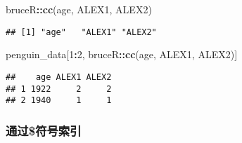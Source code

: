 \documentclass[
]{article}
\newenvironment{Shaded}{\begin{snugshade}}{\end{snugshade}}
\newcommand{\DecValTok}[1]{\textcolor[rgb]{0.00,0.00,0.81}{#1}}
\newcommand{\FunctionTok}[1]{\textcolor[rgb]{0.13,0.29,0.53}{\textbf{#1}}}
\newcommand{\NormalTok}[1]{#1}
\newcommand{\SpecialCharTok}[1]{\textcolor[rgb]{0.81,0.36,0.00}{\textbf{#1}}}
\newcommand{\StringTok}[1]{\textcolor[rgb]{0.31,0.60,0.02}{#1}}
\begin{document}
\begin{Shaded}
\begin{Highlighting}[]
\NormalTok{bruceR}\SpecialCharTok{::}\FunctionTok{cc}\NormalTok{(}\StringTok{\textquotesingle{}age, ALEX1, ALEX2\textquotesingle{}}\NormalTok{)}
\end{Highlighting}
\end{Shaded}

\begin{verbatim}
## [1] "age"   "ALEX1" "ALEX2"
\end{verbatim}

\begin{Shaded}
\begin{Highlighting}[]
\NormalTok{penguin\_data[}\DecValTok{1}\SpecialCharTok{:}\DecValTok{2}\NormalTok{, bruceR}\SpecialCharTok{::}\FunctionTok{cc}\NormalTok{(}\StringTok{\textquotesingle{}age, ALEX1, ALEX2\textquotesingle{}}\NormalTok{)]}
\end{Highlighting}
\end{Shaded}

\begin{verbatim}
##    age ALEX1 ALEX2
## 1 1922     2     2
## 2 1940     1     1
\end{verbatim}

\subsubsection{通过\$符号索引}\label{ux901aux8fc7ux7b26ux53f7ux7d22ux5f15}

\begin{Shaded}
\end{Shaded}
\end{document}
